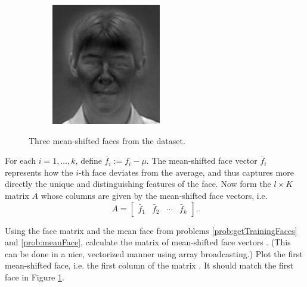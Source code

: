 \begin{figure}
\begin{subfigure}[b]{0.3\textwidth}
\end{subfigure}
\begin{subfigure}[b]{0.3\textwidth}
\includegraphics[width=\textwidth]{differenceFace2.png}
\end{subfigure}
\caption{Three mean-shifted faces from the dataset.}
\label{facialRecognition:differenceFaces}
\end{figure}
For each $i = 1,\ldots, k$, define $\bar{f}_i := f_i - \mu$.
The mean-shifted face vector $\bar{f}_i$ represents how the $i$-th face deviates from the average, and thus captures more directly the unique and distinguishing features of the face.
Now form the $l \times K$ matrix $A$ whose columns are given by the mean-shifted face vectors, i.e.
\[
A = \begin{bmatrix}
\bar{f}_1 & \bar{f}_2 & \cdots & \bar{f}_k
\end{bmatrix}.
\]
\begin{problem}
Using the face matrix  and the mean face  from problems \ref{prob:getTrainingFaces} and \ref{prob:meanFace}, calculate the
matrix of mean-shifted face vectors .
(This can be done in a nice, vectorized manner using array broadcasting.)
Plot the first mean-shifted face, i.e. the first column of the matrix .
It should match the first face in Figure \ref{facialRecognition:differenceFaces}.
\end{problem}

